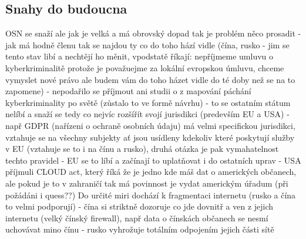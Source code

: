 \subsection{Snahy do budoucna}
OSN se snaží ale jak je velká a má obrovský dopad tak je problém něco prosadit - jak má hodně
členu tak se najdou ty co do toho hází vidle (čína, rusko - jim se tento stav libí a nechtějí ho měnit,
vpodstatě říkají: nepříjmeme umluvu o kyberkriminalitě protože je považuejme za lokální
evropskou úmluvu, chceme vymyslet nové právo ale budem vám do toho házet vidle do té doby
než se na to zapomene) - nepodařilo se příjmout ani studii o z mapování páchání
kyberkriminality po světě (zůstalo to ve formě návrhu) - to se ostatním státum nelíbí a snaží se
tedy co nejvíc rozšířít svojí jurisdikci (predevším EU a USA) - např GDPR (nařízeni o ochraně
osobních údaju) má velmi specifickou jurisdikci, vztahuje se na všechny subjekty ať jsou usídleny
kdekoliv které poskytují služby v EU (vztahuje se to i na čínu a rusko), druhá otázka je pak
vymahatelnost techto pravidel - EU se to líbí a začínají to uplatňovat i do ostatních uprav - USA
příjmuli CLOUD act, který říká že je jedno kde máš dat o amerických občanech, ale pokud je to v
zahraničí tak má povinnost je vydat americkým úřadum (při požádáni i quess??)
Do určité miri dochází k fragmentaci internetu (rusko a čína to velmi podporují) - čína si striktně
dozoruje co jde dovnitř a ven z jejich internetu (velký čínský firewall), např data o čínskách
občanech se nesmí uchovávat mino čínu - rusko vyhrožuje totálním odpojením jejich části sítě

